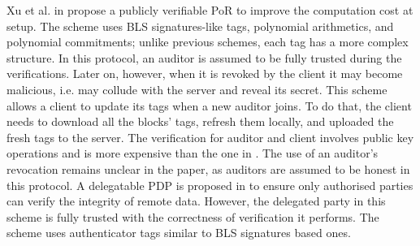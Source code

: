 Xu et al. in \cite{xu2016lightweight} propose a publicly verifiable PoR to improve the computation cost at setup. The scheme uses   BLS signatures-like tags, polynomial arithmetics, and polynomial commitments; unlike previous schemes,  each tag has a more complex structure.  In this protocol, an auditor is assumed to be fully trusted during the verifications. Later on, however, when  it is revoked by the client it may become malicious, i.e. may collude with the server and reveal its secret. This scheme allows a client to update its tags when a new auditor joins. To do that, the client needs to download all the blocks' tags, refresh them locally, and uploaded the fresh tags to the server. The verification for auditor and client involves public key operations and is more expensive than the one in \cite{armknecht2014outsourced}. The use of an auditor's revocation remains unclear in the paper, as  auditors are assumed to be honest in this protocol. A delegatable PDP is proposed in \cite{ShenT11} to ensure only authorised parties can verify the integrity of remote data. However, the delegated party in this scheme is fully trusted with the correctness of verification it performs. The scheme uses authenticator tags  similar to   BLS signatures based ones.


